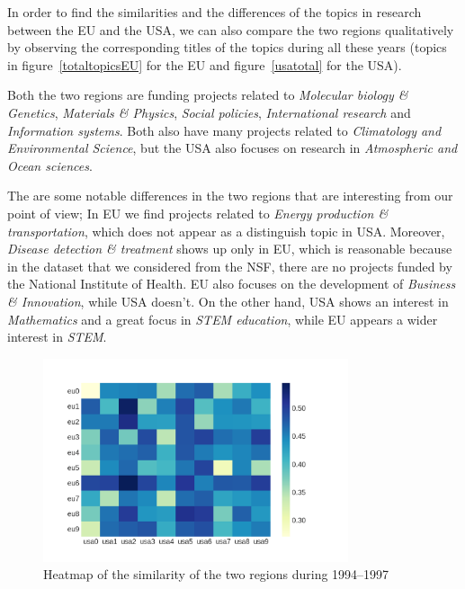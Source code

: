 \documentclass[12pt]{report}
\begin{document}
In order to find the similarities and the differences of the topics in research
between the EU and the USA, we can also compare the two regions qualitatively by
observing the corresponding titles of the topics during all these years (topics
in figure~\ref{totaltopicsEU} for the EU and figure~\ref{usatotal} for the USA).

Both the two regions are funding projects related to \emph{Molecular biology \&
Genetics}, \emph{Materials \& Physics}, \emph{Social policies},
\emph{International research} and \emph{Information systems}. Both also have
many projects related to \emph{Climatology and Environmental Science}, but the
USA also focuses on research in \emph{Atmospheric and Ocean sciences}.

The are some notable differences in the two regions that are interesting from
our point of view; In EU we find projects related to \emph{Energy production \&
transportation}, which does not appear as a distinguish topic in USA. Moreover,
\emph{Disease detection \& treatment} shows up only in EU, which is reasonable
because in the dataset that we considered from the NSF, there are no projects 
funded by the National Institute of Health. EU also focuses on the development of
\emph{Business \& Innovation}, while USA doesn't. On the other hand, USA shows
an interest in \emph{Mathematics} and a great focus in \emph{STEM education},
while EU appears a wider interest in \emph{STEM}.

\begin{figure}[H]
\centering
\includegraphics[width=0.8\textwidth]
{figs/heatmaps/heatmapFP4.png}
\caption{Heatmap of the similarity of the two regions during 1994--1997}
\label{heatmap4}
\end{figure}
\end{document}
